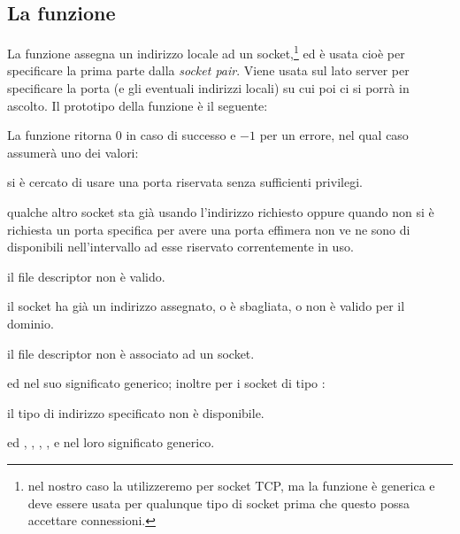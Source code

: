 \subsection{La funzione }
\label{sec:TCP_func_bind}

La funzione  assegna un indirizzo locale ad un
socket,\footnote{nel nostro caso la utilizzeremo per socket TCP, ma la
  funzione è generica e deve essere usata per qualunque tipo di socket
   prima che questo possa accettare connessioni.} ed è
usata cioè per specificare la prima parte dalla \textit{socket pair}.  Viene
usata sul lato server per specificare la porta (e gli eventuali indirizzi
locali) su cui poi ci si porrà in ascolto. Il prototipo della funzione è il
seguente:


\begin{funcproto}{
}

{La funzione ritorna $0$ in caso di successo e $-1$ per un errore, nel qual
  caso  assumerà uno dei valori: 
  \begin{errlist}
  \item[\errcode{EACCES}] si è cercato di usare una porta riservata senza
    sufficienti privilegi.
  \item[\errcode{EADDRINUSE}] qualche altro socket sta già usando l'indirizzo
    richiesto oppure quando non si è richiesta un porta specifica per avere
    una porta effimera non ve ne sono di disponibili nell'intervallo ad esse
    riservato correntemente in uso.
  \item[\errcode{EBADF}] il file descriptor non è valido.
  \item[\errcode{EINVAL}] il socket ha già un indirizzo assegnato,
    o  è sbagliata, o  non è valido per il
    dominio.
  \item[\errcode{ENOTSOCK}] il file descriptor non è associato ad un socket.
  \end{errlist}
  ed  nel suo significato generico; inoltre per i socket di
  tipo :
  \begin{errlist}
  \item[\errcode{EADDRNOTAVAIL}] il tipo di indirizzo specificato non è
    disponibile.
  \end{errlist}
  ed , , , , 
   e  nel loro significato generico.}
\end{funcproto}

